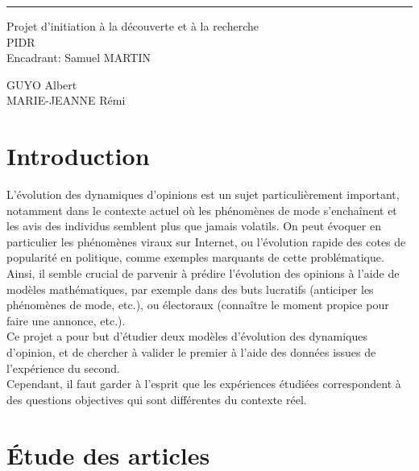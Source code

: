 \documentclass{scrreprt}
\date{}
\begin{document}
\begin{flushright}
    \rule{16cm}{5pt}\vskip1cm
    \begin{bfseries}
        \Huge{Projet d'initiation à la découverte et à la recherche \\ PIDR}\\
        \vspace{1.9cm}
        \LARGE{Encadrant: Samuel MARTIN}\\
       \vspace{10.9cm}
	\begin{center}
		GUYO Albert\\
		MARIE-JEANNE Rémi\\
	\end{center}
        \vspace{1.9cm}
    \end{bfseries}
\end{flushright}

\tableofcontents
\newpage
 

\chapter{Introduction}

L’évolution des dynamiques d’opinions est un sujet particulièrement important, notamment dans le contexte actuel où les phénomènes de mode s’enchaînent et les avis des individus semblent plus que jamais volatils. On peut évoquer en particulier les phénomènes viraux sur Internet, ou l’évolution rapide des cotes de popularité en politique, comme exemples marquants de cette problématique.\\

Ainsi, il semble crucial de parvenir à prédire l’évolution des opinions à l’aide de modèles mathématiques, par exemple dans des buts lucratifs (anticiper les phénomènes de mode, etc.), ou électoraux (connaître le moment propice pour faire une annonce, etc.).\\

Ce projet a pour but d’étudier deux modèles d’évolution des dynamiques d’opinion, et de chercher à valider le premier à l’aide des données issues de l’expérience du second. \\

Cependant, il faut garder à l’esprit que les expériences étudiées correspondent à des questions objectives qui sont différentes du contexte réel.\\


\chapter{Étude des articles}
\end{document}
